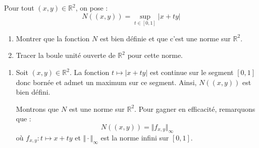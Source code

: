 \documentclass[a4paper,10pt]{report}
\begin{document}
\begin{Exa} Pour tout $(x,y) \in \mathbb{R}^2$, on pose :
$$ N((x,y)) = \sup_{t \in [0,1]} \vert x+ty \vert$$

\begin{enumerate}
\item Montrer que la fonction $N$ est bien définie et que c'est une norme sur $\mathbb{R}^2$.
\item Tracer la boule unité ouverte de $\mathbb{R}^2$ pour cette norme.
\end{enumerate}
\end{Exa}

\corr 

\begin{enumerate}
\item Soit $(x,y) \in \mathbb{R}^2$. La fonction $t \mapsto \vert x+ty \vert$ est continue sur le segment $[0,1]$ donc bornée et admet un maximum sur ce segment. Ainsi, $N((x,y))$ est bien défini.

\medskip

\noindent Montrons que $N$ est une norme sur $\mathbb{R}^2$. Pour gagner en efficacité, remarquons que :
$$ N((x,y)) = \Vert f_{x,y} \Vert_{\infty}$$
où $f_{x,y} : t \mapsto x+ty$ et $\Vert \cdot \Vert_{\infty}$ est la norme infini sur $[0,1]$.


\end{enumerate}
\end{document}
